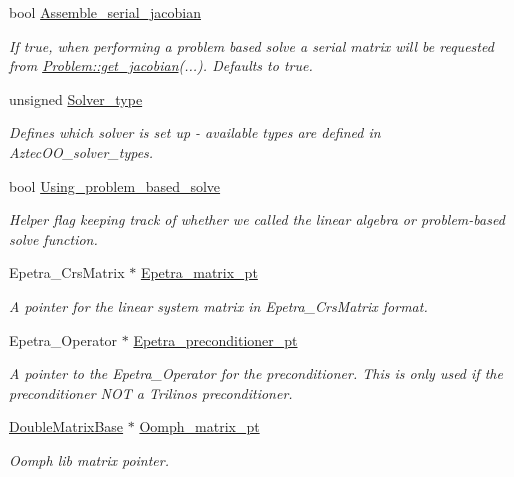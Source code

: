 \begin{DoxyCompactItemize}
bool \hyperlink{classoomph_1_1TrilinosAztecOOSolver_a3bfc11cd816eee847f102327ae4315aa}{Assemble\+\_\+serial\+\_\+jacobian}
\begin{DoxyCompactList}\small\item\em If true, when performing a problem based solve a serial matrix will be requested from \hyperlink{classoomph_1_1Problem_a4ba83bbea19db3a530539f3e9f88a7e4}{Problem\+::get\+\_\+jacobian}(...). Defaults to true. \end{DoxyCompactList}\item 
unsigned \hyperlink{classoomph_1_1TrilinosAztecOOSolver_aaa1ffdf657c54fbd5cfa097cc962050c}{Solver\+\_\+type}
\begin{DoxyCompactList}\small\item\em Defines which solver is set up -\/ available types are defined in Aztec\+O\+O\+\_\+solver\+\_\+types. \end{DoxyCompactList}\item 
bool \hyperlink{classoomph_1_1TrilinosAztecOOSolver_a015ad0b4207515558d270ef08a213125}{Using\+\_\+problem\+\_\+based\+\_\+solve}
\begin{DoxyCompactList}\small\item\em Helper flag keeping track of whether we called the linear algebra or problem-\/based solve function. \end{DoxyCompactList}\item 
Epetra\+\_\+\+Crs\+Matrix $\ast$ \hyperlink{classoomph_1_1TrilinosAztecOOSolver_a2d0905cb4a63b119e784a5caee458691}{Epetra\+\_\+matrix\+\_\+pt}
\begin{DoxyCompactList}\small\item\em A pointer for the linear system matrix in Epetra\+\_\+\+Crs\+Matrix format. \end{DoxyCompactList}\item 
Epetra\+\_\+\+Operator $\ast$ \hyperlink{classoomph_1_1TrilinosAztecOOSolver_a7a419b3a461f998608dcc9b868fb0a89}{Epetra\+\_\+preconditioner\+\_\+pt}
\begin{DoxyCompactList}\small\item\em A pointer to the Epetra\+\_\+\+Operator for the preconditioner. This is only used if the preconditioner N\+OT a Trilinos preconditioner. \end{DoxyCompactList}\item 
\hyperlink{classoomph_1_1DoubleMatrixBase}{Double\+Matrix\+Base} $\ast$ \hyperlink{classoomph_1_1TrilinosAztecOOSolver_a71d7437b0502f3be59f64258e0af458e}{Oomph\+\_\+matrix\+\_\+pt}
\begin{DoxyCompactList}\small\item\em Oomph lib matrix pointer. \end{DoxyCompactList}\item 

\end{DoxyCompactItemize}
